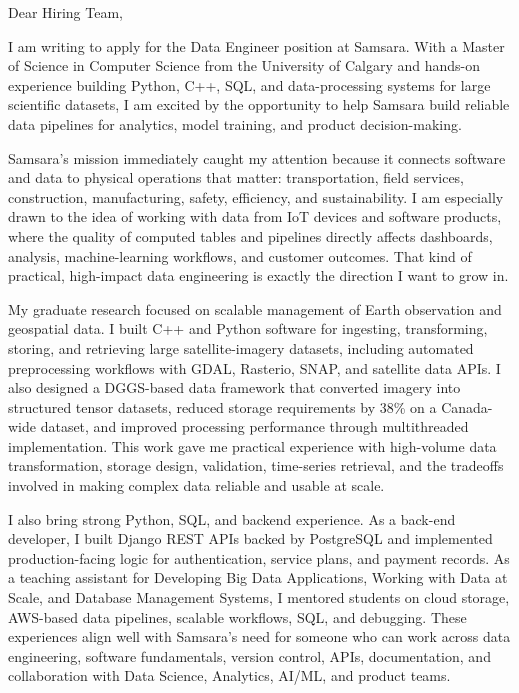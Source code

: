 \documentclass[11pt]{letter}
\begin{document}
\begin{letter}{}

\opening{Dear Hiring Team,}

I am writing to apply for the Data Engineer position at Samsara. With a Master of Science in Computer Science from the University of Calgary and hands-on experience building Python, C++, SQL, and data-processing systems for large scientific datasets, I am excited by the opportunity to help Samsara build reliable data pipelines for analytics, model training, and product decision-making.

Samsara's mission immediately caught my attention because it connects software and data to physical operations that matter: transportation, field services, construction, manufacturing, safety, efficiency, and sustainability. I am especially drawn to the idea of working with data from IoT devices and software products, where the quality of computed tables and pipelines directly affects dashboards, analysis, machine-learning workflows, and customer outcomes. That kind of practical, high-impact data engineering is exactly the direction I want to grow in.

My graduate research focused on scalable management of Earth observation and geospatial data. I built C++ and Python software for ingesting, transforming, storing, and retrieving large satellite-imagery datasets, including automated preprocessing workflows with GDAL, Rasterio, SNAP, and satellite data APIs. I also designed a DGGS-based data framework that converted imagery into structured tensor datasets, reduced storage requirements by 38\% on a Canada-wide dataset, and improved processing performance through multithreaded implementation. This work gave me practical experience with high-volume data transformation, storage design, validation, time-series retrieval, and the tradeoffs involved in making complex data reliable and usable at scale.

I also bring strong Python, SQL, and backend experience. As a back-end developer, I built Django REST APIs backed by PostgreSQL and implemented production-facing logic for authentication, service plans, and payment records. As a teaching assistant for Developing Big Data Applications, Working with Data at Scale, and Database Management Systems, I mentored students on cloud storage, AWS-based data pipelines, scalable workflows, SQL, and debugging. These experiences align well with Samsara's need for someone who can work across data engineering, software fundamentals, version control, APIs, documentation, and collaboration with Data Science, Analytics, AI/ML, and product teams.


\end{letter}
\end{document}
